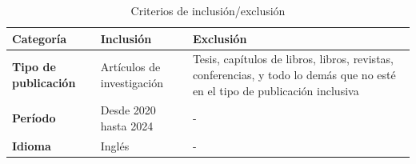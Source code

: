 \begin{table}[htbp]
	\centering
	\caption{Criterios de inclusión/exclusión}
	\label{table:inclusion_exclusion_criteria}
	\renewcommand{\arraystretch}{1}  %
	\begin{tabular}{p{1.5cm}p{2.2cm}p{3.9cm}}
		\toprule
		\textbf{Categoría}           & \textbf{Inclusión}         & \textbf{Exclusión}                                                                                                          \\
		\midrule
		\textbf{Tipo de publicación} & Artículos de investigación & Tesis, capítulos de libros, libros, revistas, conferencias, y todo lo demás que no esté en el tipo de publicación inclusiva \\
		\addlinespace[0.8em]
		\textbf{Período}             & Desde 2020 hasta 2024      & -                                                                                                                           \\
		\addlinespace[0.8em]
		\textbf{Idioma}              & Inglés                     & -                                                                                                                           \\
		\bottomrule
	\end{tabular}
\end{table}
